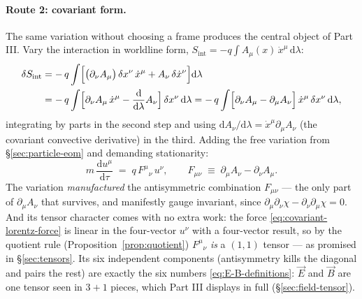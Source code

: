 \documentclass[11pt]{article}
\theoremstyle{plain}
\theoremstyle{definition}
\theoremstyle{remark}
\newcommand{\dd}{\mathrm{d}}
\newcommand{\tot}[2]{\frac{\dd #1}{\dd #2}}
\newcommand{\vE}{\vec{E}}
\newcommand{\vB}{\vec{B}}
\begin{document}
\paragraph{Route 2: covariant form.}
The same variation without choosing a frame produces the central
object of Part III. Vary the interaction in worldline form,
$S_{\text{int}} = -q\int A_\mu(x)\,\dot x^\mu\,\dd\lambda$:
\begin{align}
  \delta S_{\text{int}}
  &= -\,q \int \Bigl[
      \bigl(\partial_\nu A_\mu\bigr)\,\delta x^\nu\, \dot x^\mu
      + A_\nu\, \delta\dot x^\nu
    \Bigr] \dd\lambda
  \notag\\
  &= -\,q \int \Bigl[
      \partial_\nu A_\mu\,\dot x^\mu
      - \tot{}{\lambda}A_\nu
    \Bigr]\,\delta x^\nu\, \dd\lambda
  = -\,q \int \Bigl[
      \partial_\nu A_\mu - \partial_\mu A_\nu
    \Bigr]\,\dot x^\mu\,\delta x^\nu\, \dd\lambda ,
\end{align}
integrating by parts in the second step and using
$\dd A_\nu/\dd\lambda = \dot x^\mu \partial_\mu A_\nu$ (the covariant
convective derivative) in the third. Adding the free variation from
\S\ref{sec:particle-eom} and demanding stationarity:
\begin{equation}
  \boxed{\;
  m\,\tot{u^\mu}{\tau} \;=\; q\, F^\mu{}_\nu\, u^\nu,
  \qquad
  F_{\mu\nu} \;\equiv\; \partial_\mu A_\nu - \partial_\nu A_\mu .
  \;}
  \label{eq:covariant-lorentz-force}
\end{equation}
The variation \emph{manufactured} the antisymmetric combination
$F_{\mu\nu}$ --- the only part of $\partial_\mu A_\nu$ that survives,
and manifestly gauge invariant, since
$\partial_\mu\partial_\nu\chi - \partial_\nu\partial_\mu\chi = 0$.
And its tensor character comes with no extra work: the force
\eqref{eq:covariant-lorentz-force} is linear in the four-vector
$u^\nu$ with a four-vector result, so by the quotient rule
(Proposition~\ref{prop:quotient}) $F^\mu{}_\nu$ \emph{is} a
$(1,1)$ tensor --- as promised in \S\ref{sec:tensors}. Its
six independent components (antisymmetry kills the diagonal and
pairs the rest) are exactly the six numbers
\eqref{eq:E-B-definitions}: $\vE$ and $\vB$ are one tensor seen in
$3+1$ pieces, which Part III displays in full
(\S\ref{sec:field-tensor}).
\end{document}
